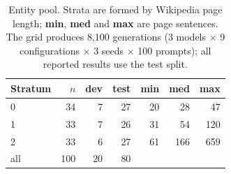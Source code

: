 \begin{table}[t]
  \centering
  \small
  \begin{tabular}{lrrrrrr}
    \toprule
    \textbf{Stratum} & \textbf{$n$} & \textbf{dev} & \textbf{test} & \textbf{min} & \textbf{med} & \textbf{max} \\
    \midrule
    0 & 34 & 7 & 27 & 20 & 28 & 47 \\
    1 & 33 & 7 & 26 & 31 & 54 & 120 \\
    2 & 33 & 6 & 27 & 61 & 166 & 659 \\
    \midrule
    all & 100 & 20 & 80 & & & \\
    \bottomrule
  \end{tabular}
  \caption{Entity pool. Strata are formed by Wikipedia page length; \textbf{min}, \textbf{med} and \textbf{max} are page sentences. The grid produces 8,100 generations (3 models $\times$ 9 configurations $\times$ 3 seeds $\times$ 100 prompts); all reported results use the test split.}
  \label{tab:data}
\end{table}

